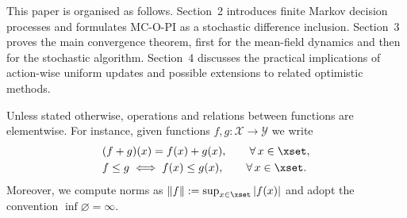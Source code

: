 This paper is organised as follows. Section~2 introduces finite Markov decision
processes and formulates MC-O-PI as a stochastic difference inclusion. Section~3 proves the
main convergence theorem, first for the mean-field dynamics and then for the stochastic
algorithm. Section~4 discusses the practical implications of action-wise uniform updates
and possible extensions to related optimistic methods.

Unless stated otherwise, operations and relations between functions are elementwise. For instance, given functions $f, g : \mathcal X \to \mathcal Y$ we write
\begin{align*}
&(f + g)(x) = f(x) + g(x), \qquad \forall \, x \in \xset ,
    \\
&f \le g \iff f(x) \le g(x), \qquad \forall \, x \in \xset .
\end{align*}
Moreover, we compute norms as $\|f\| := \sup_{x \in \xset} |f(x)|$
and adopt the convention $\inf \varnothing = \infty$.


























































































